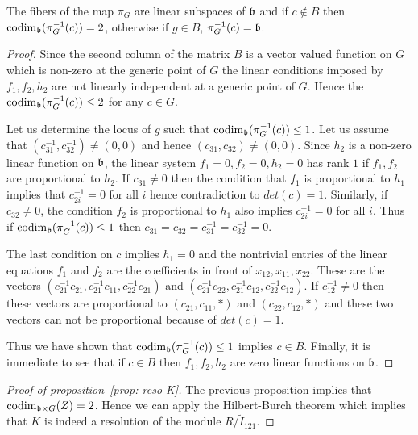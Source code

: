 \begin{proposition} The fibers of the map $\pi_G$ are linear subspaces of $\mathfrak{b}$ and
if $c\notin B$ then $\mathrm{codim}_{\mathfrak{b}}(\pi^{-1}_G(c))=2$, otherwise if $g\in B$, $\pi_G^{-1}(c)=\mathfrak{b}$.
\end{proposition}
\begin{proof}
Since the second column of the matrix $B$ is a vector valued function on $G$ which is non-zero at the generic point of $G$ the linear conditions
imposed by $f_1,f_2,h_2$ are not linearly independent at a generic point of $G$. Hence the $\mathrm{codim}_{\mathfrak{b}}(\pi_G^{-1}(c))\le 2$ for any $c\in G$.

Let us determine the locus of $g$ such that $\mathrm{codim}_{\mathfrak{b}}(\pi_G^{-1}(c))\le 1$. Let us assume that $(c^{-1}_{31},c^{-1}_{32})\ne (0,0)$ and hence  $(c_{31},c_{32})\ne (0,0)$.
Since $h_2$ is a non-zero linear function on $\mathfrak{b}$, the
linear system $f_1=0,f_2=0,h_2=0$ has rank $1$ if $f_1,f_2$ are proportional to  $h_2$. If $c_{31}\ne 0$ then the condition that $f_1$ is proportional to $h_1$ implies that
$c^{-1}_{2i}=0$ for all $i$ hence contradiction to $det(c)=1$. Similarly, if $c_{32}\ne 0$, the condition $f_2$ is proportional to $h_1$  also implies  $c^{-1}_{2i}=0$ for all $i$.
Thus if $\mathrm{codim}_{\mathfrak{b}}(\pi_G^{-1}(c))\le 1$ then $c_{31}=c_{32}=c^{-1}_{31}=c^{-1}_{32}=0$.

The last condition on $c$ implies $h_1=0$ and the nontrivial entries of the linear equations $f_1$ and $f_2$ are the coefficients in front of  $x_{12},x_{11},x_{22}$. These are the  vectors
$(c^{-1}_{21} c_{21}, c_{21}^{-1} c_{11}, c_{22}^{-1}c_{21})$ and $(c^{-1}_{21} c_{22}, c_{21}^{-1} c_{12}, c_{22}^{-1}c_{12})$. If $c^{-1}_{12}\ne 0$ then these vectors are proportional
to $(c_{21},c_{11},*)$ and $(c_{22},c_{12},*)$ and these two vectors can not be proportional because of $det(c)=1$.

Thus we have shown that $\mathrm{codim}_{\mathfrak{b}}(\pi^{-1}_G(c))\le 1$ implies $c\in B$. Finally, it is immediate to see that if $c\in B$ then $f_1,f_2,h_2$ are zero linear functions on $\mathfrak{b}$.
\end{proof}


\begin{proof}[Proof of proposition~\ref{prop: reso K}]
The previous proposition implies that $\mathrm{codim}_{\mathfrak{b}\times G}(Z)=2$. Hence we can apply the Hilbert-Burch theorem \cite{E2} which implies that $K$ is indeed a resolution of
the module $R/\tilde{I}_{121}$.
\end{proof}


